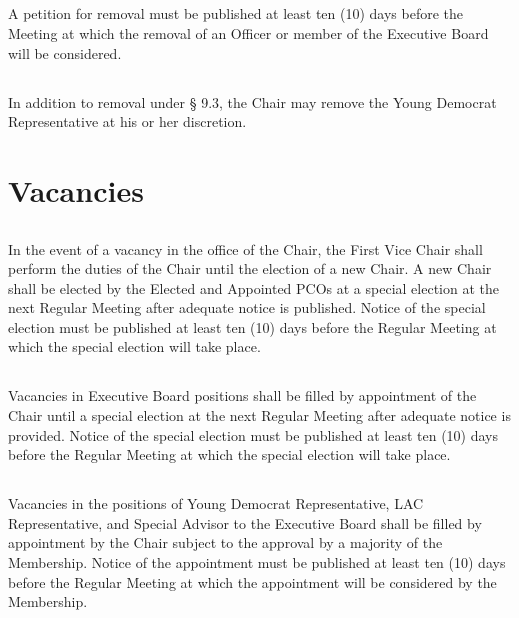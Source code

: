 \documentclass{article}
\begin{document}
\subsection{}
A petition for removal must be published at least ten (10) days before the Meeting at which the removal of an Officer or member of the Executive Board will be considered.

\subsection{}
In addition to removal under § 9.3, the Chair may remove the Young Democrat Representative at his or her discretion.

\section{Vacancies}
\subsection{}
In the event of a vacancy in the office of the Chair, the First Vice Chair shall perform the duties of the Chair until the election of a new Chair. A new Chair shall be elected by the Elected and Appointed PCOs at a special election at the next Regular Meeting after adequate notice is published. Notice of the special election must be published at least ten (10) days before the Regular Meeting at which the special election will take place.

\subsection{}
Vacancies in Executive Board positions shall be filled by appointment of the Chair until a special election at the next Regular Meeting after adequate notice is provided. Notice of the special election must be published at least ten (10) days before the Regular Meeting at which the special election will take place.

\subsection{}
Vacancies in the positions of Young Democrat Representative, LAC Representative, and Special Advisor to the Executive Board shall be filled by appointment by the Chair subject to the approval by a majority of the Membership. Notice of the appointment must be published at least ten (10) days before the Regular Meeting at which the appointment will be considered by the Membership.
\end{document}
